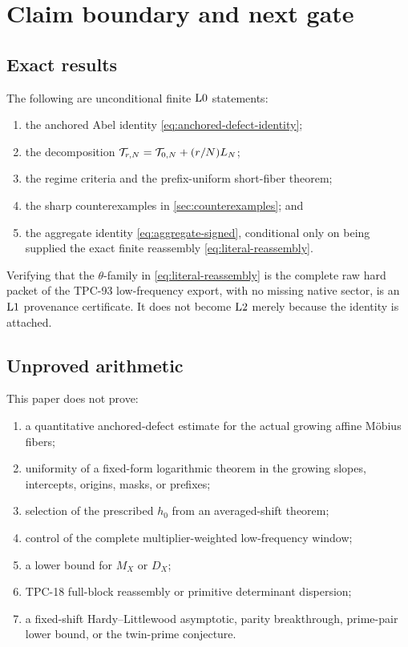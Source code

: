 \section{Claim boundary and next gate}
\label{sec:claim-boundary}

\subsection{Exact results}

The following are unconditional finite \(\mathrm{L0}\) statements:
\begin{enumerate}[label=\textup{(\roman*)},leftmargin=2.5em]
\item the anchored Abel identity
  \eqref{eq:anchored-defect-identity};
\item the decomposition
  \(\mathcal T_{r,N}=\mathcal T_{0,N}+(r/N)L_N\);
\item the regime criteria and the prefix-uniform short-fiber theorem;
\item the sharp counterexamples in \cref{sec:counterexamples}; and
\item the aggregate identity
  \eqref{eq:aggregate-signed}, conditional only on being supplied the
  exact finite reassembly \eqref{eq:literal-reassembly}.
\end{enumerate}

Verifying that the \(\theta\)-family in
\eqref{eq:literal-reassembly} is the complete raw hard packet of the
TPC-93 low-frequency export, with no missing native sector, is an
\(\mathrm{L1}\) provenance certificate.  It does not become \(\mathrm{L2}\)
merely because the identity is attached.

\subsection{Unproved arithmetic}

This paper does not prove:
\begin{enumerate}[label=\textup{(\alph*)},leftmargin=2.5em]
\item a quantitative anchored-defect estimate for the actual growing
  affine M\"obius fibers;
\item uniformity of a fixed-form logarithmic theorem in the growing
  slopes, intercepts, origins, masks, or prefixes;
\item selection of the prescribed \(h_0\) from an averaged-shift
  theorem;
\item control of the complete multiplier-weighted low-frequency
  window;
\item a lower bound for \(M_X\) or \(D_X\);
\item TPC-18 full-block reassembly or primitive determinant
  dispersion;
\item a fixed-shift Hardy--Littlewood asymptotic, parity
  breakthrough, prime-pair lower bound, or the twin-prime
  conjecture.
\end{enumerate}

